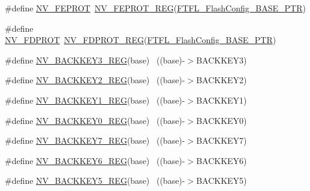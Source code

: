 \begin{DoxyCompactItemize}
\item 
\#define \hyperlink{group___n_v___register___accessor___macros_ga042021b7c9ba543352055825ab37f11b}{N\+V\+\_\+\+F\+E\+P\+R\+OT}~\hyperlink{group___n_v___register___accessor___macros_ga689f6db632fecfda17b3a0af63529b29}{N\+V\+\_\+\+F\+E\+P\+R\+O\+T\+\_\+\+R\+EG}(\hyperlink{group___n_v___peripheral_gad199a235b90fe3e6afb977f2d6a9c565}{F\+T\+F\+L\+\_\+\+Flash\+Config\+\_\+\+B\+A\+S\+E\+\_\+\+P\+TR})
\item 
\#define \hyperlink{group___n_v___register___accessor___macros_gaa36202cc8cc9caa02eee166ffce5efc6}{N\+V\+\_\+\+F\+D\+P\+R\+OT}~\hyperlink{group___n_v___register___accessor___macros_ga8c387944c38c4df1397982458df8a2f1}{N\+V\+\_\+\+F\+D\+P\+R\+O\+T\+\_\+\+R\+EG}(\hyperlink{group___n_v___peripheral_gad199a235b90fe3e6afb977f2d6a9c565}{F\+T\+F\+L\+\_\+\+Flash\+Config\+\_\+\+B\+A\+S\+E\+\_\+\+P\+TR})
\item 
\#define \hyperlink{group___n_v___register___accessor___macros_ga3f3d8bddafcafafb27fb8981656492e1}{N\+V\+\_\+\+B\+A\+C\+K\+K\+E\+Y3\+\_\+\+R\+EG}(base)                                    ~((base)-\/$>$B\+A\+C\+K\+K\+E\+Y3)
\item 
\#define \hyperlink{group___n_v___register___accessor___macros_gaad90d55fc5c046a8e8508b04cbe2fbbb}{N\+V\+\_\+\+B\+A\+C\+K\+K\+E\+Y2\+\_\+\+R\+EG}(base)                                    ~((base)-\/$>$B\+A\+C\+K\+K\+E\+Y2)
\item 
\#define \hyperlink{group___n_v___register___accessor___macros_gaa618f324e87cf548f4736270e46fcc57}{N\+V\+\_\+\+B\+A\+C\+K\+K\+E\+Y1\+\_\+\+R\+EG}(base)                                    ~((base)-\/$>$B\+A\+C\+K\+K\+E\+Y1)
\item 
\#define \hyperlink{group___n_v___register___accessor___macros_ga905f2d4f792d634634d339e5b6170fe1}{N\+V\+\_\+\+B\+A\+C\+K\+K\+E\+Y0\+\_\+\+R\+EG}(base)                                    ~((base)-\/$>$B\+A\+C\+K\+K\+E\+Y0)
\item 
\#define \hyperlink{group___n_v___register___accessor___macros_ga7f6090f0eb664b59d0e6e79b492fe8e4}{N\+V\+\_\+\+B\+A\+C\+K\+K\+E\+Y7\+\_\+\+R\+EG}(base)                                    ~((base)-\/$>$B\+A\+C\+K\+K\+E\+Y7)
\item 
\#define \hyperlink{group___n_v___register___accessor___macros_ga9d64e9e2568804d0cf1de4cb5a1d3f1f}{N\+V\+\_\+\+B\+A\+C\+K\+K\+E\+Y6\+\_\+\+R\+EG}(base)                                    ~((base)-\/$>$B\+A\+C\+K\+K\+E\+Y6)
\item 
\#define \hyperlink{group___n_v___register___accessor___macros_gaeeb967dc21f8077cef911eae743d7f12}{N\+V\+\_\+\+B\+A\+C\+K\+K\+E\+Y5\+\_\+\+R\+EG}(base)                                    ~((base)-\/$>$B\+A\+C\+K\+K\+E\+Y5)

\end{DoxyCompactItemize}
